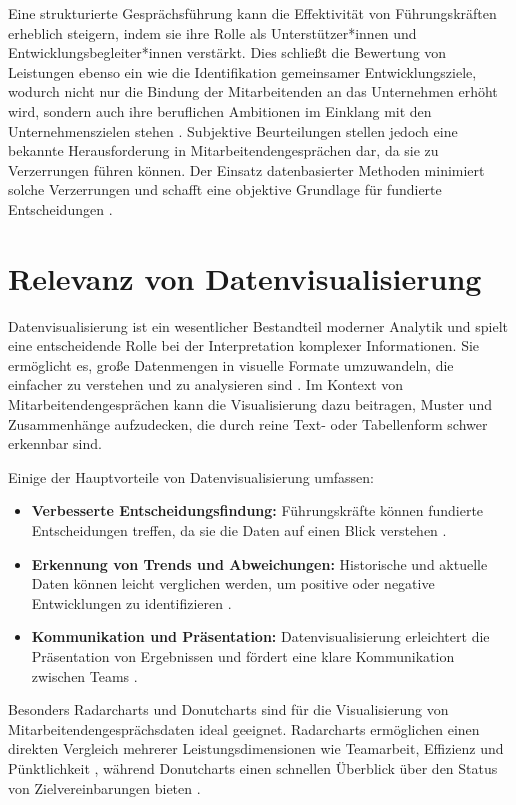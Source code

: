 Eine strukturierte Gesprächsführung kann die Effektivität von Führungskräften erheblich steigern, indem sie ihre Rolle als Unterstützer*innen und Entwicklungsbegleiter*innen verstärkt. Dies schließt die Bewertung von Leistungen ebenso ein wie die Identifikation gemeinsamer Entwicklungsziele, wodurch nicht nur die Bindung der Mitarbeitenden an das Unternehmen erhöht wird, sondern auch ihre beruflichen Ambitionen im Einklang mit den Unternehmenszielen stehen \cite{barton2012}. Subjektive Beurteilungen stellen jedoch eine bekannte Herausforderung in Mitarbeitendengesprächen dar, da sie zu Verzerrungen führen können. Der Einsatz datenbasierter Methoden minimiert solche Verzerrungen und schafft eine objektive Grundlage für fundierte Entscheidungen \cite{heikkila2018}.

\section{Relevanz von Datenvisualisierung}
Datenvisualisierung ist ein wesentlicher Bestandteil moderner Analytik und spielt eine entscheidende Rolle bei der Interpretation komplexer Informationen. Sie ermöglicht es, große Datenmengen in visuelle Formate umzuwandeln, die einfacher zu verstehen und zu analysieren sind \cite{kirk2016data}. Im Kontext von Mitarbeitendengesprächen kann die Visualisierung dazu beitragen, Muster und Zusammenhänge aufzudecken, die durch reine Text- oder Tabellenform schwer erkennbar sind.

Einige der Hauptvorteile von Datenvisualisierung umfassen:
\begin{itemize}
    \item \textbf{Verbesserte Entscheidungsfindung:} Führungskräfte können fundierte Entscheidungen treffen, da sie die Daten auf einen Blick verstehen \cite{kirk2016data}.
    \item \textbf{Erkennung von Trends und Abweichungen:} Historische und aktuelle Daten können leicht verglichen werden, um positive oder negative Entwicklungen zu identifizieren \cite{ware2012information}.
    \item \textbf{Kommunikation und Präsentation:} Datenvisualisierung erleichtert die Präsentation von Ergebnissen und fördert eine klare Kommunikation zwischen Teams \cite{evergreen2016effective}.
\end{itemize}

Besonders Radarcharts und Donutcharts sind für die Visualisierung von Mitarbeitendengesprächsdaten ideal geeignet. Radarcharts ermöglichen einen direkten Vergleich mehrerer Leistungsdimensionen wie Teamarbeit, Effizienz und Pünktlichkeit \cite{heikkila2018}, während Donutcharts einen schnellen Überblick über den Status von Zielvereinbarungen bieten \cite{evergreen2016effective}.

